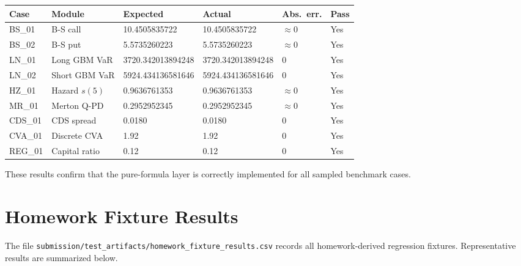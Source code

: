 \documentclass[11pt]{article}
\newcommand{\code}[1]{\texttt{#1}}
\begin{document}
\begin{center}
\footnotesize
\begin{tabular}{L{1.5cm}L{2.1cm}L{3.7cm}L{3.7cm}L{2cm}l}
\toprule
\textbf{Case} & \textbf{Module} & \textbf{Expected} & \textbf{Actual} & \textbf{Abs.\ err.} & \textbf{Pass} \\
\midrule
BS\_01  & B-S call        & 10.4505835722     & 10.4505835722     & $\approx 0$  & Yes \\
BS\_02  & B-S put         & 5.5735260223      & 5.5735260223      & $\approx 0$  & Yes \\
LN\_01  & Long GBM VaR    & 3720.342013894248 & 3720.342013894248 & 0            & Yes \\
LN\_02  & Short GBM VaR   & 5924.434136581646 & 5924.434136581646 & 0            & Yes \\
HZ\_01  & Hazard $s(5)$   & 0.9636761353      & 0.9636761353      & $\approx 0$  & Yes \\
MR\_01  & Merton Q-PD     & 0.2952952345      & 0.2952952345      & $\approx 0$  & Yes \\
CDS\_01 & CDS spread      & 0.0180            & 0.0180            & 0            & Yes \\
CVA\_01 & Discrete CVA    & 1.92              & 1.92              & 0            & Yes \\
REG\_01 & Capital ratio   & 0.12              & 0.12              & 0            & Yes \\
\bottomrule
\end{tabular}
\end{center}

These results confirm that the pure-formula layer is correctly implemented
for all sampled benchmark cases.

\section{Homework Fixture Results}

\begin{sloppypar}
The file \code{submission/\allowbreak test\_artifacts/\allowbreak homework\_fixture\_\allowbreak results.csv}
records all homework-derived regression fixtures.  Representative results
are summarized below.
\end{sloppypar}
\end{document}
